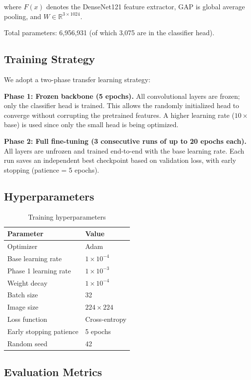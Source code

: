 \documentclass[conference]{IEEEtran}
\begin{document}
where $F(x)$ denotes the DenseNet121 feature extractor, GAP is global average pooling, and $W \in \mathbb{R}^{3 \times 1024}$.

Total parameters: 6,956,931 (of which 3,075 are in the classifier head).

\subsection{Training Strategy}

We adopt a two-phase transfer learning strategy:

\textbf{Phase 1: Frozen backbone (5 epochs).}
All convolutional layers are frozen; only the classifier head is trained.
This allows the randomly initialized head to converge without corrupting the pretrained features.
A higher learning rate ($10 \times$ base) is used since only the small head is being optimized.

\textbf{Phase 2: Full fine-tuning (3 consecutive runs of up to 20 epochs each).}
All layers are unfrozen and trained end-to-end with the base learning rate.
Each run saves an independent best checkpoint based on validation loss, with early stopping (patience = 5 epochs).

\subsection{Hyperparameters}

\begin{table}[H]
\centering
\caption{Training hyperparameters}
\label{tab:hyperparams}
\begin{tabular}{ll}
\toprule
\textbf{Parameter} & \textbf{Value} \\
\midrule
Optimizer & Adam \\
Base learning rate & $1 \times 10^{-4}$ \\
Phase 1 learning rate & $1 \times 10^{-3}$ \\
Weight decay & $1 \times 10^{-4}$ \\
Batch size & 32 \\
Image size & $224 \times 224$ \\
Loss function & Cross-entropy \\
Early stopping patience & 5 epochs \\
Random seed & 42 \\
\bottomrule
\end{tabular}
\end{table}

\subsection{Evaluation Metrics}
\end{document}
